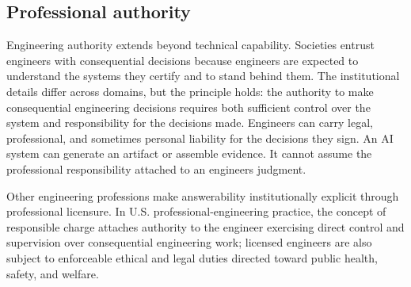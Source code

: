 \subsection{Professional authority}\label{heading:professional-authority}


Engineering authority extends beyond technical capability. Societies entrust engineers with consequential decisions because engineers are expected to understand the systems they certify and to stand behind them. The institutional details differ across domains, but the principle holds: the authority to make consequential engineering decisions requires both sufficient control over the system and responsibility for the decisions made. Engineers can carry legal, professional, and sometimes personal liability for the decisions they sign. An AI system can generate an artifact or assemble evidence. It cannot assume the professional responsibility attached to an engineer\textquotesingle s judgment.


Other engineering professions make answerability institutionally explicit through professional licensure. In U.S. professional-engineering practice, the concept of responsible charge attaches authority to the engineer exercising direct control and supervision over consequential engineering work; licensed engineers are also subject to enforceable ethical and legal duties directed toward public health, safety, and welfare.


